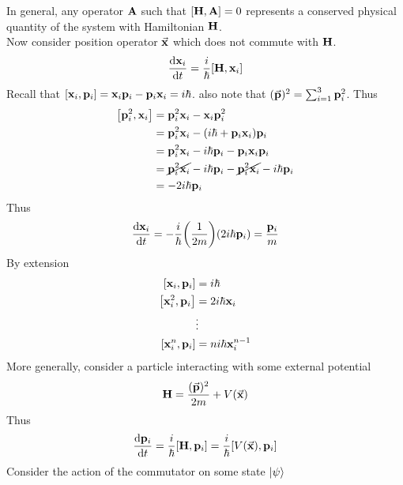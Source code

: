 \documentclass[12pt,a4paper,titlepage]{article}
\begin{document}
In general, any operator $\vb{A}$ such that $\comm{\vb{H}}{\vb{A}}=0$ represents a conserved physical quantity of the system with Hamiltonian $\vb{H}$.\\

Now consider position operator $\vec{\vb{x}}$ which does not commute with $\vb{H}$.
\begin{equation}
\dv{\vb{x}_{i}}{t}=\frac{i}{\hbar}\comm{\vb{H}}{\vb{x}_{i}}
\end{equation}
Recall that $\comm{\vb{x}_{i}}{\vb{p}_{i}}=\vb{x}_{i}\vb{p}_{i}-\vb{p}_{i}\vb{x}_{i}=i\hbar$. also note that $(\vec{\vb{p}})^{2}=\sum_{i=1}^{3}\vb{p}_{i}^{2}$. Thus
\begin{equation}
\begin{aligned}
\comm{\vb{p}_{i}^{2}}{\vb{x}_{i}}&=\vb{p}_{i}^{2}\vb{x}_{i}-\vb{x}_{i}\vb{p}_{i}^{2}\\
&=\vb{p}_{i}^{2}\vb{x}_{i}-(i\hbar+\vb{p}_{i}\vb{x}_{i})\vb{p}_{i}\\
&=\vb{p}_{i}^{2}\vb{x}_{i}-i\hbar\vb{p}_{i}-\vb{p}_{i}\vb{x}_{i}\vb{p}_{i}\\
&=\cancel{\vb{p}_{i}^{2}\vb{x}_{i}}-i\hbar\vb{p}_{i}-\cancel{\vb{p}_{i}^{2}\vb{x}_{i}}-i\hbar\vb{p}_{i}\\
&=-2i\hbar\vb{p}_{i}
\end{aligned}
\end{equation}
Thus
\begin{equation}
\dv{\vb{x}_{i}}{t}=-\frac{i}{\hbar}\qty(\frac{1}{2m})(2i\hbar\vb{p}_{i})=\frac{\vb{p}_{i}}{m}
\end{equation}
By extension
\begin{equation}
\begin{aligned}
\comm{\vb{x}_{i}}{\vb{p}_{i}}&=i\hbar\\
\comm{\vb{x}_{i}^{2}}{\vb{p}_{i}}&=2i\hbar\vb{x}_{i}\\
&\vdots\\
\comm{\vb{x}_{i}^{n}}{\vb{p}_{i}}&=ni\hbar\vb{x}_{i}^{n-1}
\end{aligned}
\end{equation}
More generally, consider a particle interacting with some external potential
\begin{equation}
\vb{H}=\frac{(\vec{\vb{p}})^{2}}{2m}+V(\vec{\vb{x}})
\end{equation}
Thus
\begin{equation}
\dv{\vb{p}_{i}}{t}=\frac{i}{\hbar}\comm{\vb{H}}{\vb{p}_{i}}=\frac{i}{\hbar}\comm{V(\vec{\vb{x}})}{\vb{p}_{i}}
\end{equation}
Consider the action of the commutator on some state $\ket{\psi}$
\end{document}
